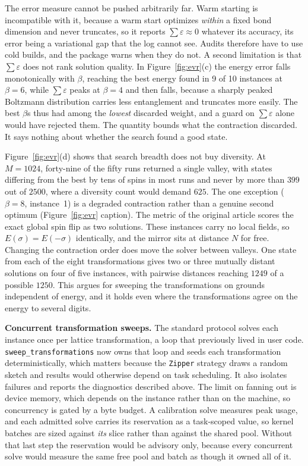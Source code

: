 \documentclass[preprint,12pt,a4paper]{elsarticle}
\begin{document}
The error measure cannot be pushed arbitrarily far. Warm starting is incompatible
with it, because a warm start optimizes \emph{within} a fixed bond dimension and
never truncates, so it reports $\sum\varepsilon\approx0$ whatever its accuracy, its
error being a variational gap that the log cannot see. Audits therefore have to use
cold builds, and the package warns when they do not. A second limitation is that
$\sum\varepsilon$ does not rank solution quality. In Figure~\ref{fig:evr}(c) the
energy error falls monotonically with $\beta$, reaching the best energy found in
9 of 10 instances at $\beta=6$, while $\sum\varepsilon$ peaks at $\beta=4$ and
then falls, because a sharply peaked Boltzmann distribution carries less
entanglement and truncates more easily. The best $\beta$s thus had among the
\emph{lowest} discarded weight, and a guard on $\sum\varepsilon$ alone would have
rejected them. The quantity bounds what the contraction discarded. It says nothing
about whether the search found a good state.

Figure~\ref{fig:evr}(d) shows that search breadth does not buy diversity. At
$M=1024$, forty-nine of the fifty runs returned a single valley, with states
differing from the best by tens of spins in most runs and never by more than $399$
out of $2500$, where a diversity count would demand $625$. The one exception
($\beta{=}8$, instance~1) is a degraded contraction rather than a genuine second
optimum (Figure~\ref{fig:evr} caption). The metric of the original article scores
the exact global spin flip as two solutions. These instances carry no local fields,
so $E(\sigma)=E(-\sigma)$ identically, and the mirror sits at distance $N$ for free.
Changing the contraction order does move the solver between valleys. One state from
each of the eight transformations gives two or three mutually distant solutions on
four of five instances, with pairwise distances reaching $1249$ of a possible
$1250$. This argues for sweeping the transformations on grounds independent of
energy, and it holds even where the transformations agree on the energy to several
digits.

\textbf{Concurrent transformation sweeps.} The standard protocol solves each
instance once per lattice transformation, a loop that previously lived in user code.
\texttt{sweep\_transformations} now owns that loop and seeds each transformation
deterministically, which matters because the \texttt{Zipper} strategy draws a random
sketch and results would otherwise depend on task scheduling. It also isolates
failures and reports the diagnostics described above. The limit on fanning out is
device memory, which depends on the instance rather than on the machine, so
concurrency is gated by a byte budget. A calibration solve measures peak usage, and
each admitted solve carries its reservation as a task-scoped value, so kernel
batches are sized against \emph{its} slice rather than against the shared pool.
Without that last step the reservation would be advisory only, because every
concurrent solve would measure the same free pool and batch as though it owned all
of it.
\end{document}
